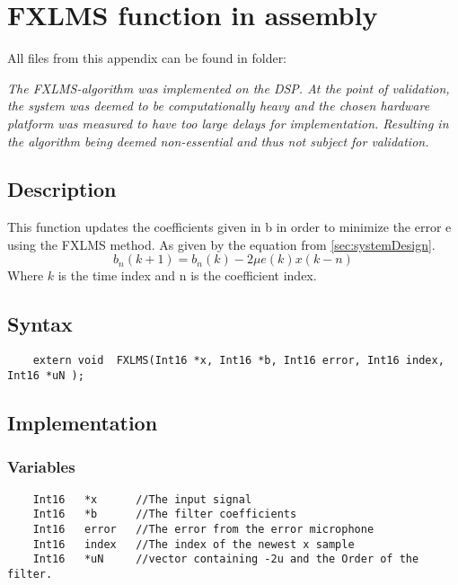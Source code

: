 
\section{FXLMS function in assembly}

All files from this appendix can be found in folder: \\

\textit{The FXLMS-algorithm was implemented on the DSP. At the point of validation, the system was deemed to be computationally heavy and the chosen hardware platform was measured to have too large delays for implementation. Resulting in the algorithm being deemed non-essential and thus not subject for validation.} 

\subsection{Description}
This function updates the coefficients given in b in order to minimize the error e using the FXLMS method. As given by the equation from \autoref{sec:systemDesign}.
\begin{equation}
	b_n(k+1)=b_n(k)-2\mu e(k)x(k-n)
\end{equation}
Where $k$ is the time index and n is the coefficient index.

\subsection{Syntax} 
\begin{lstlisting}
	extern void  FXLMS(Int16 *x, Int16 *b, Int16 error, Int16 index, Int16 *uN );
\end{lstlisting}

\subsection{Implementation}

\subsubsection{Variables}
\begin{lstlisting}
	Int16 	*x 		//The input signal
	Int16	*b		//The filter coefficients
	Int16	error	//The error from the error microphone
	Int16	index	//The index of the newest x sample
	Int16	*uN		//vector containing -2u and the Order of the filter.
\end{lstlisting}


